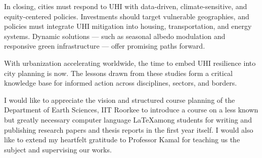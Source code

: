 \documentclass[draft]{agujournal}
\begin{document}
In closing, cities must respond to UHI with data-driven, climate-sensitive, and equity-centered policies. Investments should target vulnerable geographies, and policies must integrate UHI mitigation into housing, transportation, and energy systems. Dynamic solutions — such as seasonal albedo modulation and responsive green infrastructure — offer promising paths forward.

With urbanization accelerating worldwide, the time to embed UHI resilience into city planning is now. The lessons drawn from these studies form a critical knowledge base for informed action across disciplines, sectors, and borders.


\acknowledgments
I would like to appreciate the vision and structured course planning of the Department of Earth Sciences, IIT Roorkee to introduce a course on a less known but greatly necessary computer language \LaTeX among students for writing and publishing research papers and thesis reports in the first year itself. I would also like to extend my heartfelt gratitude to Professor Kamal for teaching us the subject and supervising our works.  


\cite{3decades}
\cite{energyconsumption}
\cite{uhireview}
\cite{uhiincome}
\cite{uhimortality}
\end{document}
